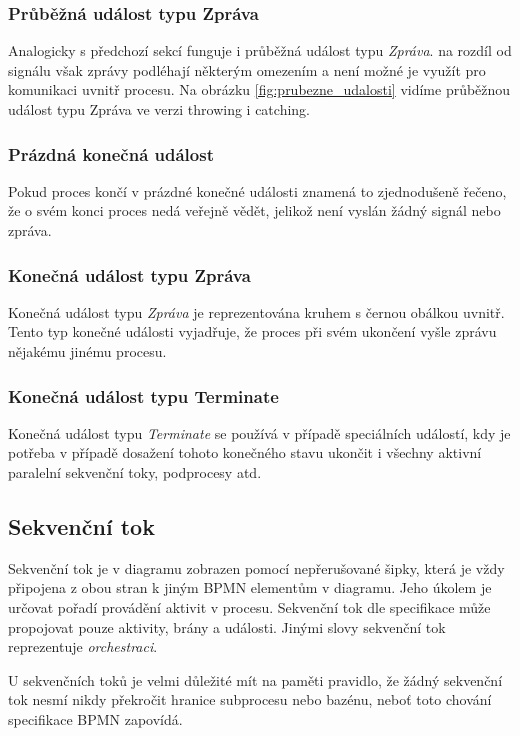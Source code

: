 \subsubsection{Průběžná událost typu Zpráva}
Analogicky s předchozí sekcí funguje i průběžná událost typu \textit{Zpráva}. na rozdíl od signálu však zprávy podléhají některým omezením a není možné je využít pro komunikaci uvnitř procesu. Na obrázku \ref{fig:prubezne_udalosti} vidíme průběžnou událost typu Zpráva ve verzi throwing i catching.

\subsubsection{Prázdná konečná událost}
Pokud proces končí v prázdné konečné události znamená to zjednodušeně řečeno, že o svém konci proces nedá veřejně vědět, jelikož není vyslán žádný signál nebo zpráva.

\subsubsection{Konečná událost typu Zpráva}
Konečná událost typu \textit{Zpráva} je reprezentována kruhem s černou obálkou uvnitř. Tento typ konečné události vyjadřuje, že proces při svém ukončení vyšle zprávu nějakému jinému procesu.

\subsubsection{Konečná událost typu Terminate}
Konečná událost typu \textit{Terminate} se používá v případě speciálních událostí, kdy je potřeba v případě dosažení tohoto konečného stavu ukončit i všechny aktivní paralelní sekvenční toky, podprocesy atd.

\subsection{Sekvenční tok}
Sekvenční tok je v diagramu zobrazen pomocí nepřerušované šipky, která je vždy připojena z obou stran k jiným BPMN elementům v diagramu. Jeho úkolem je určovat pořadí provádění aktivit v procesu. Sekvenční tok dle specifikace může propojovat pouze aktivity, brány a události. Jinými slovy sekvenční tok reprezentuje \textit{orchestraci}. \cite{Silver2011}

U sekvenčních toků je velmi důležité mít na paměti pravidlo, že žádný sekvenční tok nesmí nikdy překročit hranice subprocesu nebo bazénu, neboť toto chování specifikace BPMN zapovídá.

